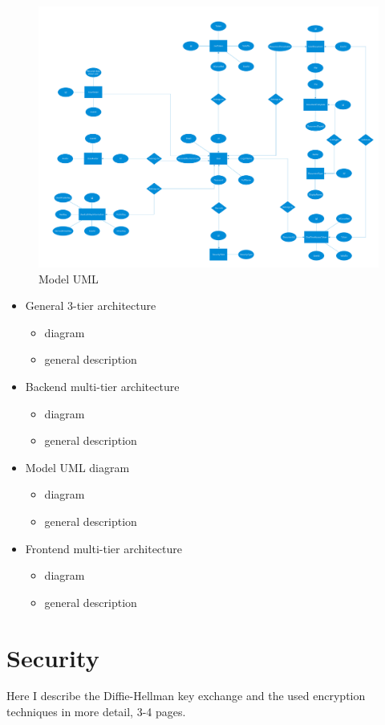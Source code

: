 \begin{figure}[H]
	\centering
	\includegraphics[scale=0.29]{entity-relationship-diagram}
	\caption{Model UML}
\end{figure}


\begin{itemize}
	\item General 3-tier architecture
	\begin{itemize}
		\item diagram
		\item general description
	\end{itemize}
	\item Backend multi-tier architecture
	\begin{itemize}
		\item diagram
		\item general description
	\end{itemize}
	\item Model UML diagram
	\begin{itemize}
		\item diagram
		\item general description
	\end{itemize}
	\item Frontend multi-tier architecture
	\begin{itemize}
		\item diagram
		\item general description
	\end{itemize}
\end{itemize}

\section{Security}
Here I describe the Diffie-Hellman key exchange and the used encryption techniques in more detail, 3-4 pages.


